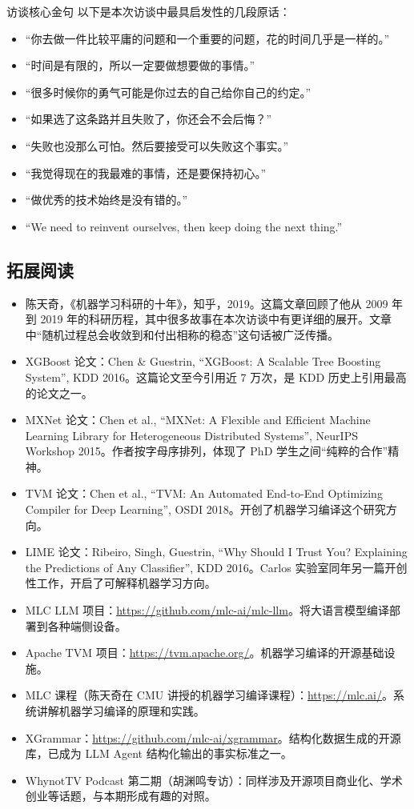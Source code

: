 \documentclass[a4paper]{article}
\begin{document}
\begin{importantbox}{访谈核心金句}
以下是本次访谈中最具启发性的几段原话：
\begin{itemize}
    \item ``你去做一件比较平庸的问题和一个重要的问题，花的时间几乎是一样的。''
    \item ``时间是有限的，所以一定要做想要做的事情。''
    \item ``很多时候你的勇气可能是你过去的自己给你自己的约定。''
    \item ``如果选了这条路并且失败了，你还会不会后悔？''
    \item ``失败也没那么可怕。然后要接受可以失败这个事实。''
    \item ``我觉得现在的我最难的事情，还是要保持初心。''
    \item ``做优秀的技术始终是没有错的。''
    \item ``We need to reinvent ourselves, then keep doing the next thing.''
\end{itemize}
\end{importantbox}

\subsection{拓展阅读}

\begin{itemize}
    \item 陈天奇，《机器学习科研的十年》，知乎，2019。这篇文章回顾了他从 2009 年到 2019 年的科研历程，其中很多故事在本次访谈中有更详细的展开。文章中``随机过程总会收敛到和付出相称的稳态''这句话被广泛传播。
    \item XGBoost 论文：Chen \& Guestrin, ``XGBoost: A Scalable Tree Boosting System'', KDD 2016。这篇论文至今引用近 7 万次，是 KDD 历史上引用最高的论文之一。
    \item MXNet 论文：Chen et al., ``MXNet: A Flexible and Efficient Machine Learning Library for Heterogeneous Distributed Systems'', NeurIPS Workshop 2015。作者按字母序排列，体现了 PhD 学生之间``纯粹的合作''精神。
    \item TVM 论文：Chen et al., ``TVM: An Automated End-to-End Optimizing Compiler for Deep Learning'', OSDI 2018。开创了机器学习编译这个研究方向。
    \item LIME 论文：Ribeiro, Singh, Guestrin, ``Why Should I Trust You? Explaining the Predictions of Any Classifier'', KDD 2016。Carlos 实验室同年另一篇开创性工作，开启了可解释机器学习方向。
    \item MLC LLM 项目：\url{https://github.com/mlc-ai/mlc-llm}。将大语言模型编译部署到各种端侧设备。
    \item Apache TVM 项目：\url{https://tvm.apache.org/}。机器学习编译的开源基础设施。
    \item MLC 课程（陈天奇在 CMU 讲授的机器学习编译课程）：\url{https://mlc.ai/}。系统讲解机器学习编译的原理和实践。
    \item XGrammar：\url{https://github.com/mlc-ai/xgrammar}。结构化数据生成的开源库，已成为 LLM Agent 结构化输出的事实标准之一。
    \item WhynotTV Podcast 第二期（胡渊鸣专访）：同样涉及开源项目商业化、学术创业等话题，与本期形成有趣的对照。
\end{itemize}
\end{document}
